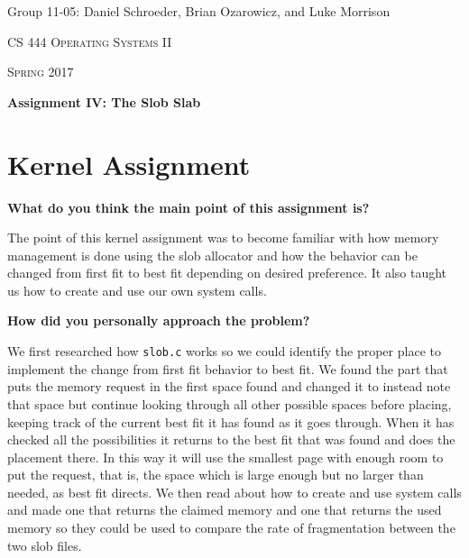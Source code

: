 \documentclass[10pt,letterpaper,draftclsnofoot,onecolumn]{IEEEtran}
\begin{document}
\begin{titlepage}
\centering
{\Large Group 11-05: Daniel Schroeder, Brian Ozarowicz, and Luke Morrison\par}
\vspace{1cm}
{\scshape\Large CS 444 Operating Systems II\par}
{\scshape\Large Spring 2017\par}
\vspace{1cm}
{\huge\bfseries Assignment IV: The Slob Slab\par}
\vspace{2cm}
\begin{abstract}
This document is a summary of Assignment 4 for CS 444 Operating Systems II at Oregon State University Spring 2017. This document includes the design and implementation of the kernel assignment to implement the Slob Slab, responses to the design and implimenation questions for the kernel and concurrency assignments, and a work log.
\end{abstract}
\end{titlepage}

\section{Kernel Assignment}
\bigskip

\noindent\textbf{What do you think the main point of this assignment is?}
\medskip

\medskip

\noindent The point of this kernel assignment was to become familiar with how memory management is done using the slob allocator and how the behavior can be changed from first fit to best fit depending on desired preference. It also taught us how to create and use our own system calls.
\bigskip

\noindent\textbf{How did you personally approach the problem?}
\medskip

\medskip

\noindent We first researched how \texttt{slob.c} works so we could identify the proper place to implement the change from first fit behavior to best fit. We found the part that puts the memory request in the first space found and changed it to instead note that space but continue looking through all other possible spaces before placing, keeping track of the current best fit it has found as it goes through. When it has checked all the possibilities it returns to the best fit that was found and does the placement there. In this way it will use the smallest page with enough room to put the request, that is, the space which is large enough but no larger than needed, as best fit directs. We then read about how to create and use system calls and made one that returns the claimed memory and one that returns the used memory so they could be used to compare the rate of fragmentation between the two slob files.
\bigskip
\end{document}
